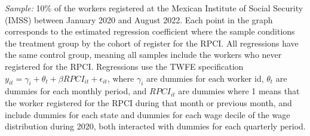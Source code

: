 \documentclass[oneside,11pt]{article}
\begin{document}
\scriptsize{
\noindent \textit{Sample:} 10\% of the workers registered at the Mexican Institute of Social Security (IMSS) between January 2020 and August 2022. Each point in the graph corresponds to the estimated regression coefficient where the sample conditions the treatment group by the cohort of register for the RPCI. All regressions have the same control group, meaning all samples include the workers who never registered for the RPCI. Regressions use the TWFE specification $y_{it} = \gamma_{i} + \theta_{t}+ \beta RPCI_{it} +\epsilon_{it}$, where $\gamma_{i}$ are dummies for each worker id, $\theta_{t}$ are dummies for each monthly period, and $RPCI_{it}$ are dummies where 1 means that the worker registered for the RPCI during that month or previous month, and include dummies for each state and dummies for each wage decile of the wage distribution during 2020, both interacted with dummies for each quarterly period. 
}
\end{document}
